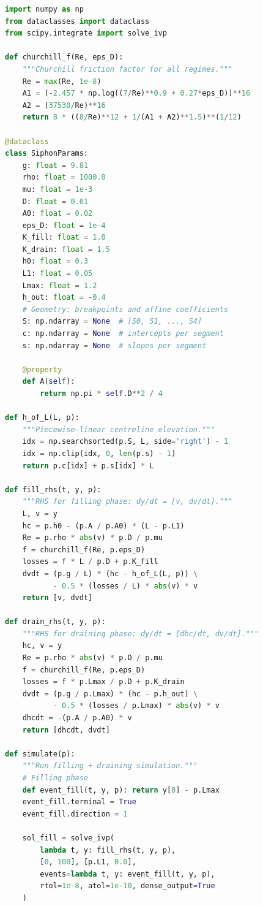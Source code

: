 \documentclass[11pt]{article}
\theoremstyle{definition}
\begin{document}
\begin{lstlisting}[style=pythonblock,language=Python]
import numpy as np
from dataclasses import dataclass
from scipy.integrate import solve_ivp

def churchill_f(Re, eps_D):
    """Churchill friction factor for all regimes."""
    Re = max(Re, 1e-8)
    A1 = (-2.457 * np.log((7/Re)**0.9 + 0.27*eps_D))**16
    A2 = (37530/Re)**16
    return 8 * ((8/Re)**12 + 1/(A1 + A2)**1.5)**(1/12)

@dataclass
class SiphonParams:
    g: float = 9.81
    rho: float = 1000.0
    mu: float = 1e-3
    D: float = 0.01
    A0: float = 0.02
    eps_D: float = 1e-4
    K_fill: float = 1.0
    K_drain: float = 1.5
    h0: float = 0.3
    L1: float = 0.05
    Lmax: float = 1.2
    h_out: float = -0.4
    # Geometry: breakpoints and affine coefficients
    S: np.ndarray = None  # [S0, S1, ..., S4]
    c: np.ndarray = None  # intercepts per segment
    s: np.ndarray = None  # slopes per segment
    
    @property
    def A(self):
        return np.pi * self.D**2 / 4

def h_of_L(L, p):
    """Piecewise-linear centreline elevation."""
    idx = np.searchsorted(p.S, L, side='right') - 1
    idx = np.clip(idx, 0, len(p.s) - 1)
    return p.c[idx] + p.s[idx] * L

def fill_rhs(t, y, p):
    """RHS for filling phase: dy/dt = [v, dv/dt]."""
    L, v = y
    hc = p.h0 - (p.A / p.A0) * (L - p.L1)
    Re = p.rho * abs(v) * p.D / p.mu
    f = churchill_f(Re, p.eps_D)
    losses = f * L / p.D + p.K_fill
    dvdt = (p.g / L) * (hc - h_of_L(L, p)) \
           - 0.5 * (losses / L) * abs(v) * v
    return [v, dvdt]

def drain_rhs(t, y, p):
    """RHS for draining phase: dy/dt = [dhc/dt, dv/dt]."""
    hc, v = y
    Re = p.rho * abs(v) * p.D / p.mu
    f = churchill_f(Re, p.eps_D)
    losses = f * p.Lmax / p.D + p.K_drain
    dvdt = (p.g / p.Lmax) * (hc - p.h_out) \
           - 0.5 * (losses / p.Lmax) * abs(v) * v
    dhcdt = -(p.A / p.A0) * v
    return [dhcdt, dvdt]

def simulate(p):
    """Run filling + draining simulation."""
    # Filling phase
    def event_fill(t, y, p): return y[0] - p.Lmax
    event_fill.terminal = True
    event_fill.direction = 1
    
    sol_fill = solve_ivp(
        lambda t, y: fill_rhs(t, y, p),
        [0, 100], [p.L1, 0.0],
        events=lambda t, y: event_fill(t, y, p),
        rtol=1e-8, atol=1e-10, dense_output=True
    )
    

\end{lstlisting}
\end{document}
